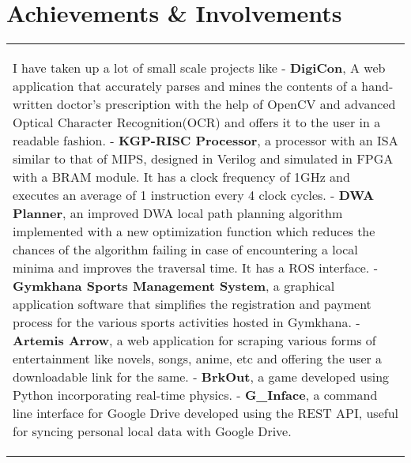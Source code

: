 \section{\textcolor{primary}{Achievements \& Involvements}}
\vspace{-0.6cm}
\begin{tabular}{p{19.7cm}}
\begin{description}[font=$\bullet$\hspace{2mm}\normalsize]
 \item[\textcolor{extra}{Projects -}] I have taken up a lot of small scale projects like \newline
 - \textbf{DigiCon}, A web application that accurately parses and mines the contents of a hand-written doctor's prescription with \vspace{0.15cm} the help of OpenCV and advanced Optical Character Recognition(OCR) and offers it to the user in a readable fashion. \newline
 - \textbf{KGP-RISC Processor}, a processor with an ISA similar to that of MIPS, designed in Verilog and simulated in FPGA with a BRAM module. \vspace{0.15cm} It has a clock frequency of 1GHz and executes an average of 1 instruction every 4 clock cycles. \newline
 - \textbf{DWA Planner}, an improved DWA local path planning algorithm implemented with a new optimization function which reduces the chances of the algorithm failing in case of encountering a local minima and improves the traversal time. It \vspace{0.15cm}has a ROS interface.\newline
 - \textbf{Gymkhana Sports Management System}, a graphical application software that simplifies the registration and payment process for the various sports activities \vspace{0.15cm} hosted in Gymkhana.  \newline 
 - \textbf{Artemis Arrow}, a web application for scraping various forms of entertainment like novels, songs, anime, etc and offering the user a downloadable \vspace{0.15cm} link for the same. \newline 
 - \textbf{BrkOut}, a game developed using \vspace{0.15cm}Python incorporating real-time physics. \newline
 - \textbf{G\_Inface}, a command line interface for Google Drive developed using the REST API, useful for syncing personal local data with Google Drive. \newline
 

\end{description}
\end{tabular}
